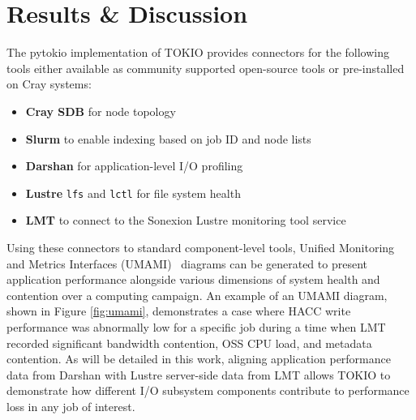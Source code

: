\section{Results \& Discussion}

The pytokio implementation of TOKIO provides connectors for the following tools either available as community supported open-source tools or pre-installed on Cray systems:

\begin{itemize}
\item \textbf{Cray SDB} for node topology
\item \textbf{Slurm} to enable indexing based on job ID and node lists
\item \textbf{Darshan} for application-level I/O profiling
\item \textbf{Lustre} \texttt{lfs} and \texttt{lctl} for file system health
\item \textbf{LMT} to connect to the Sonexion Lustre monitoring tool service
\end{itemize}

Using these connectors to standard component-level tools, Unified Monitoring and Metrics Interfaces (UMAMI)~\cite{Lockwood2017} diagrams can be generated to present application performance alongside various dimensions of system health and contention over a computing campaign.  An example of an UMAMI diagram, shown in Figure \ref{fig:umami}, demonstrates a case where HACC write performance was abnormally low for a specific job during a time when LMT recorded significant bandwidth contention, OSS CPU load, and metadata contention.  As will be detailed in this work, aligning application performance data from Darshan with Lustre server-side data from LMT allows TOKIO to demonstrate how different I/O subsystem components contribute to performance loss in any job of interest.
% 
% 

